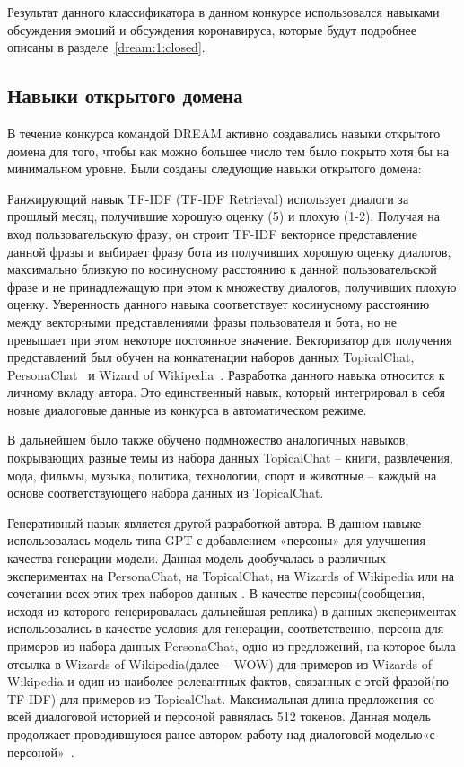 Результат данного классификатора в данном конкурсе использовался навыками обсуждения эмоций и обсуждения коронавируса, которые будут подробнее описаны в разделе~\ref{dream:1:closed}.

\subsection{Навыки открытого домена}

В течение конкурса командой {DREAM} активно создавались навыки открытого домена для того, чтобы как можно большее число тем было покрыто хотя бы на минимальном уровне. Были созданы следующие навыки открытого домена:

Ранжирующий навык TF-IDF (TF-IDF Retrieval) использует диалоги за прошлый месяц, получившие хорошую оценку (5) и плохую (1-2). Получая на вход пользовательскую фразу, он строит TF-IDF векторное представление~\cite{tfidf} данной фразы и выбирает фразу бота из получивших хорошую оценку диалогов, максимально близкую по косинусному расстоянию к данной пользовательской фразе и не принадлежащую при этом к множеству диалогов, получивших плохую оценку. Уверенность данного навыка соответствует косинусному расстоянию между векторными представлениями фразы пользователя и бота, но не превышает при этом некоторе постоянное значение. Векторизатор для получения представлений был обучен на конкатенации наборов данных TopicalChat\cite{topicalchat}, PersonaChat~\cite{personachat} и Wizard of Wikipedia~\cite{wow}. Разработка данного навыка относится к личному вкладу автора.  Это единственный навык, который интегрировал в себя новые диалоговые данные из конкурса в автоматическом режиме.

В дальнейшем было также обучено подмножество аналогичных навыков, покрывающих разные темы из набора данных TopicalChat  -- книги, развлечения, мода, фильмы, музыка, политика, технологии, спорт и животные -- каждый на основе соответствующего набора данных из TopicalChat.

Генеративный навык является другой разработкой автора. В данном навыке использовалась модель типа GPT\cite{radford_2018_gpt} с добавлением «персоны» для улучшения качества генерации модели. Данная модель дообучалась в различных экспериментах на PersonaChat, на TopicalChat, на Wizards of Wikipedia или на сочетании всех этих трех наборов данных . В качестве персоны(сообщения, исходя из которого генерировалась дальнейшая реплика) в данных экспериментах использовались в качестве условия для генерации, соответственно, персона для примеров из набора данных PersonaChat, одно из предложений, на которое была отсылка в Wizards of Wikipedia(далее -- WOW) для примеров из Wizards of Wikipedia и один из наиболее релевантных фактов, связанных с этой фразой(по TF-IDF) для примеров из TopicalChat. Максимальная длина предложения со всей диалоговой историей и персоной равнялась 512 токенов.  Данная модель продолжает проводившуюся ранее автором работу над диалоговой моделью«с персоной»~\cite{Болотин_Карпов_Рашков_Шкурак_2019}.

